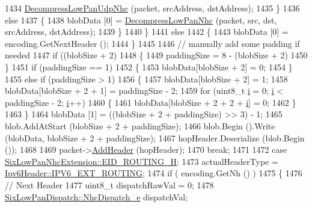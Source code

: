 \begin{DoxyCode}
1434               \hyperlink{classns3_1_1SixLowPanNetDevice_a0b31fbe0bdc3a4dd59b9f7426aec8ed8}{DecompressLowPanUdpNhc} (packet, srcAddress, dstAddress);
1435             \}
1436           \textcolor{keywordflow}{else}
1437             \{
1438               blobData [0] = \hyperlink{classns3_1_1SixLowPanNetDevice_af69701425fa2e02ab4a7fdcd1db99cc8}{DecompressLowPanNhc} (packet, src, dst, srcAddress, 
      dstAddress);
1439             \}
1440         \}
1441       \textcolor{keywordflow}{else}
1442         \{
1443           blobData [0] = encoding.GetNextHeader ();
1444         \}
1445 
1446       \textcolor{comment}{// manually add some padding if needed}
1447       \textcolor{keywordflow}{if} ((blobSize + 2) %
1448         \{
1449           paddingSize = 8 - (blobSize + 2) %
1450         \}
1451       \textcolor{keywordflow}{if} (paddingSize == 1)
1452         \{
1453           blobData[blobSize + 2] = 0;
1454         \}
1455       \textcolor{keywordflow}{else} \textcolor{keywordflow}{if} (paddingSize > 1)
1456         \{
1457           blobData[blobSize + 2] = 1;
1458           blobData[blobSize + 2 + 1] = paddingSize - 2;
1459           \textcolor{keywordflow}{for} (uint8\_t \hyperlink{bernuolliDistribution_8m_a6f6ccfcf58b31cb6412107d9d5281426}{i} = 0; \hyperlink{bernuolliDistribution_8m_a6f6ccfcf58b31cb6412107d9d5281426}{i} < paddingSize - 2; \hyperlink{bernuolliDistribution_8m_a6f6ccfcf58b31cb6412107d9d5281426}{i}++)
1460             \{
1461               blobData[blobSize + 2 + 2 + \hyperlink{bernuolliDistribution_8m_a6f6ccfcf58b31cb6412107d9d5281426}{i}] = 0;
1462             \}
1463         \}
1464       blobData [1] = ((blobSize + 2 + paddingSize) >> 3) - 1;
1465       blob.AddAtStart (blobSize + 2 + paddingSize);
1466       blob.Begin ().Write (blobData, blobSize + 2 + paddingSize);
1467       hopHeader.Deserialize (blob.Begin ());
1468 
1469       packet->\hyperlink{classns3_1_1Packet_a465108c595a0bc592095cbcab1832ed8}{AddHeader} (hopHeader);
1470       \textcolor{keywordflow}{break};
1471 
1472     \textcolor{keywordflow}{case} \hyperlink{classns3_1_1SixLowPanNhcExtension_ac692a22abe80c30bcbafa57ef36bf5adaeb4cdb5e404fc0a43e7ea60be5f24b40}{SixLowPanNhcExtension::EID\_ROUTING\_H}:
1473       actualHeaderType = \hyperlink{classns3_1_1Ipv6Header_a226429221a066c5e3b1f260caf27d1e9a4f6f9116305705bc2b3d04ff5c4bd2a8}{Ipv6Header::IPV6\_EXT\_ROUTING};
1474       \textcolor{keywordflow}{if} ( encoding.GetNh () )
1475         \{
1476           \textcolor{comment}{// Next Header}
1477           uint8\_t dispatchRawVal = 0;
1478           \hyperlink{classns3_1_1SixLowPanDispatch_acbf93399dca3b5424dcc76de45a57f5f}{SixLowPanDispatch::NhcDispatch\_e} dispatchVal;

\end{DoxyCode}
